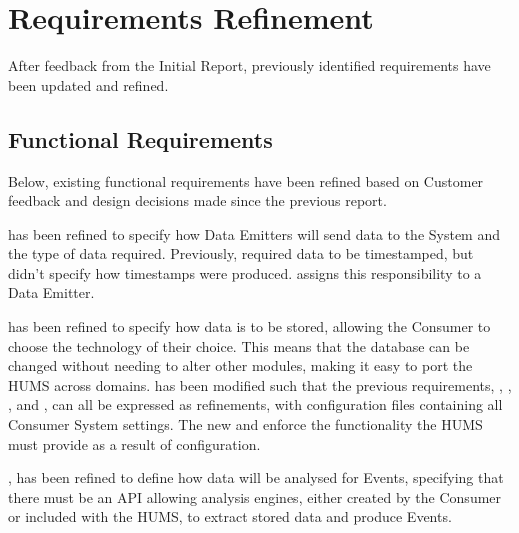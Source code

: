 \section{Requirements Refinement}
\label{sec:requirements}
After feedback from the Initial Report, previously identified requirements have been updated and refined.

\subsection{Functional Requirements}
\label{sec:requirements-functional}
Below, existing functional requirements have been refined based on Customer feedback and design decisions made since the previous report.

 has been refined to specify how Data Emitters will send data to the System and the type of data required. Previously,  required data to be timestamped, but didn't specify how timestamps were produced.  assigns this responsibility to a Data Emitter.

 has been refined to specify how data is to be stored, allowing the Consumer to choose the technology of their choice. This means that the database can be changed without needing to alter other modules, making it easy to port the HUMS across domains.
 has been modified such that the previous requirements, , , , and , can all be expressed as refinements, with 
configuration files containing all Consumer System settings. The new  and  enforce the functionality the HUMS must provide as a result of configuration.

, has been refined to define how data will be analysed for Events, specifying that there must be an API allowing analysis engines, either created by the Consumer or included with the HUMS, to extract stored data
and produce Events. 

